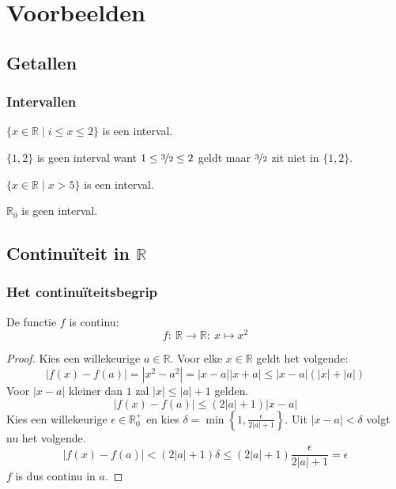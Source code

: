\documentclass[main.tex]{subfiles}
\begin{document}
\chapter{Voorbeelden}
\label{cha:voorbeelden}


\section{Getallen}

\subsection{Intervallen}
\begin{vb}
  $\{x\in \mathbb{R} \mid i \le x \le 2\}$ is een interval.
\end{vb}

\begin{vb}
  $\{1,2\}$ is geen interval want $1 \le \nicefrac{3}{2} \le 2$ geldt maar $\nicefrac{3}{2}$ zit niet in $\{1,2\}$.  
\end{vb}

\begin{vb}
  $\{x\in \mathbb{R} \mid x > 5\}$ is een interval.
\end{vb}

\begin{vb}
  $\mathbb{R}_{0}$ is geen interval.
\end{vb}

\section{Continu\"iteit in $\mathbb{R}$}
\label{sec:continuiteit-mathbbr}

\subsection{Het continu\"iteitsbegrip}
\label{sec:het-cont}

\begin{vb}
  De functie $f$ is continu:
  \[ f:\ \mathbb{R} \rightarrow \mathbb{R}:\ x \mapsto x^{2} \]

  \begin{proof}
    Kies een willekeurige $a \in \mathbb{R}$.
    Voor elke $x\in \mathbb{R}$ geldt het volgende:
    \[ |f(x)-f(a)| = |x^{2}-a^{2}| = |x-a||x+a| \le |x-a|(|x|+|a|) \]
    Voor $|x-a|$ kleiner dan $1$ zal $|x| \le |a|+1$ gelden.
    \[ |f(x)-f(a)| \le (2|a|+1)|x-a| \]
    Kies een willekeurige $\epsilon \in \mathbb{R}_{0}^{+}$ en kies $\delta = \min\left\{ 1, \frac{\epsilon}{2|a|+1} \right\}$.
    Uit $|x-a|< \delta$ volgt nu het volgende.
    \[ |f(x)-f(a)| < (2|a|+1)\delta \le (2|a|+1)\frac{\epsilon}{2|a|+1} = \epsilon \]
    $f$ is dus continu in $a$.
  \end{proof}
\end{vb}
\end{document}
